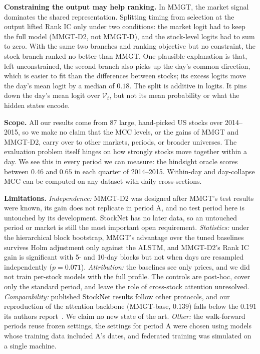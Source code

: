\documentclass[conference]{IEEEtran}
\begin{document}
\textbf{Constraining the output may help ranking.} In MMGT, the market signal
dominates the shared representation. Splitting timing from selection at the output
lifted Rank IC only under two conditions: the market logit had to keep the full
model (MMGT-D2, not MMGT-D), and the stock-level logits had to sum to zero. With the
same two branches and ranking objective but no constraint, the stock branch ranked
no better than MMGT. One plausible explanation is that, left unconstrained, the
second branch also picks up the day's common direction, which is easier to fit than
the differences between stocks; its excess logits move the day's mean logit by a
median of $0.18$. The split is additive in logits. It pins down the day's mean logit
over $\mathcal{V}_t$, but not its mean probability or what the hidden states encode.

\textbf{Scope.} All our results come from 87 large, hand-picked US stocks over
2014--2015, so we make no claim that the MCC levels, or the gains of MMGT and
MMGT-D2, carry over to other markets, periods, or broader universes. The evaluation
problem itself hinges on how strongly stocks move together within a day. We see this
in every period we can measure: the hindsight oracle scores between $0.46$ and
$0.65$ in each quarter of 2014--2015. Within-day and day-collapse MCC can be
computed on any dataset with daily cross-sections.

\textbf{Limitations.} \emph{Independence:} MMGT-D2 was designed after MMGT's test
results were known, its gain does not replicate in period A, and no test period here
is untouched by its development. StockNet has no later data, so an untouched period
or market is still the most important open requirement. \emph{Statistics:} under the
hierarchical block bootstrap, MMGT's advantage over the tuned baselines survives Holm
adjustment only against the ALSTM, and MMGT-D2's Rank IC gain is significant with 5-
and 10-day blocks but not when days are resampled independently ($p=0.071$).
\emph{Attribution:} the baselines see only prices, and we did not train per-stock
models with the full profile. The controls are post-hoc, cover only the standard
period, and leave the role of cross-stock attention unresolved.
\emph{Comparability:} published StockNet results follow other protocols, and our
reproduction of the attention backbone (MMGT-base, $0.139$) falls below the $0.191$
its authors report~\cite{yoo2021dtml}. We claim no new state of the art.
\emph{Other:} the walk-forward periods reuse frozen settings, the settings for
period A were chosen using models whose training data included A's dates, and
federated training was simulated on a single machine.
\end{document}
